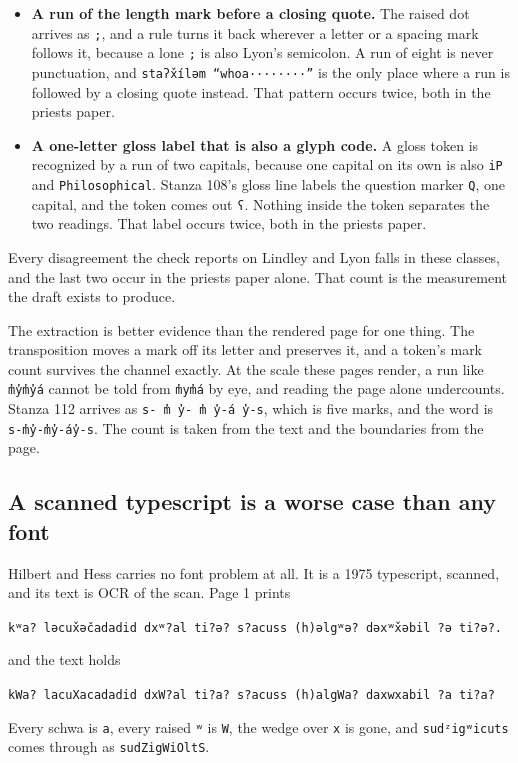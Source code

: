 \begin{itemize}
\item \textbf{A run of the length mark before a closing quote.} The raised dot arrives as \texttt{;}, and a rule turns it back wherever a letter or a spacing mark follows it, because a lone \texttt{;} is also Lyon's semicolon. A run of eight is never punctuation, and \texttt{staʔx̌íləm “whoa········”} is the only place where a run is followed by a closing quote instead. That pattern occurs twice, both in the priests paper.
\item \textbf{A one-letter gloss label that is also a glyph code.} A gloss token is recognized by a run of two capitals, because one capital on its own is also \texttt{iP} and \texttt{Philosophical}. Stanza 108's gloss line labels the question marker \texttt{Q}, one capital, and the token comes out \texttt{ʕ}. Nothing inside the token separates the two readings. That label occurs twice, both in the priests paper.
\end{itemize}

Every disagreement the check reports on Lindley and Lyon falls in these classes, and the last two occur in the priests paper alone. That count is the measurement the draft exists to produce.

The extraction is better evidence than the rendered page for one thing. The transposition moves a mark off its letter and preserves it, and a token's mark count survives the channel exactly. At the scale these pages render, a run like \texttt{m̓y̓m̓y̓á} cannot be told from \texttt{m̓ym̓á} by eye, and reading the page alone undercounts. Stanza 112 arrives as \texttt{s- m̓ y̓- m̓ y̓-á y̓-s}, which is five marks, and the word is \texttt{s-m̓y̓-m̓y̓-áy̓-s}. The count is taken from the text and the boundaries from the page.

\subsection{A scanned typescript is a worse case than any font}

Hilbert and Hess \cite{src:Hilbert-and-Hess-1975} carries no font problem at all. It is a 1975 typescript, scanned, and its text is OCR of the scan. Page 1 prints

\texttt{kʷa? ləcux̌əčadadid dxʷ?al ti?ə? s?acuss (h)əlgʷə? dəxʷx̌əbil ?ə ti?ə?.}

and the text holds

\texttt{kWa? lacuXacadadid dxW?al ti?a? s?acuss (h)algWa? daxwxabil ?a ti?a?}

Every schwa is \texttt{a}, every raised \texttt{ʷ} is \texttt{W}, the wedge over \texttt{x} is gone, and \texttt{sudᶻigʷicuts} comes through as \texttt{sudZigWiOltS}.

